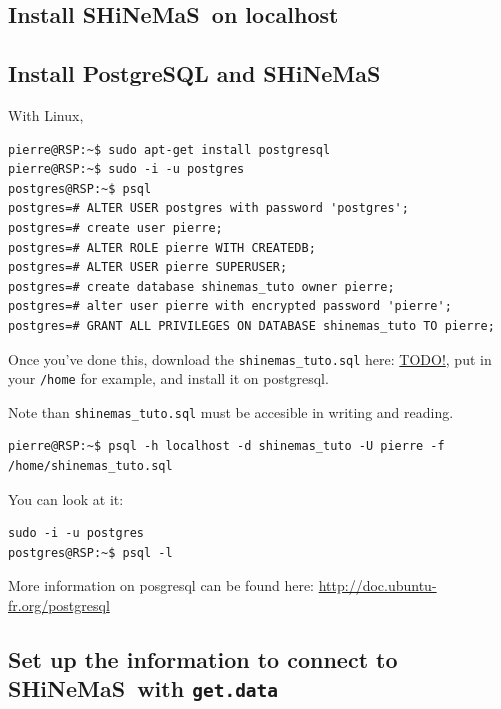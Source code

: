 \documentclass{article}\usepackage[]{graphicx}\usepackage[]{color}
\newcommand{\BD}{SHiNeMaS}
\begin{document}
\newpage



\newpage

\begin{appendices}


\section{Install \BD~on localhost}
\label{install_shinemas}



\subsection{Install PostgreSQL and \BD}

With Linux,
\begin{verbatim}
pierre@RSP:~$ sudo apt-get install postgresql
pierre@RSP:~$ sudo -i -u postgres
postgres@RSP:~$ psql
postgres=# ALTER USER postgres with password 'postgres';
postgres=# create user pierre;
postgres=# ALTER ROLE pierre WITH CREATEDB;
postgres=# ALTER USER pierre SUPERUSER;
postgres=# create database shinemas_tuto owner pierre;
postgres=# alter user pierre with encrypted password 'pierre';
postgres=# GRANT ALL PRIVILEGES ON DATABASE shinemas_tuto TO pierre;
\end{verbatim}


Once you've done this, download the \texttt{shinemas\_tuto.sql} here: \url{TODO!}, put in your \texttt{/home} for example, and install it on postgresql.

Note than \texttt{shinemas\_tuto.sql} must be accesible in writing and reading.

\begin{verbatim}
pierre@RSP:~$ psql -h localhost -d shinemas_tuto -U pierre -f /home/shinemas_tuto.sql
\end{verbatim}

You can look at it:

\begin{verbatim}
sudo -i -u postgres
postgres@RSP:~$ psql -l
\end{verbatim}

More information on posgresql can be found here: \url{http://doc.ubuntu-fr.org/postgresql}


\subsection{Set up the information to connect to \BD~with \texttt{get.data}}


\end{appendices}
\end{document}
